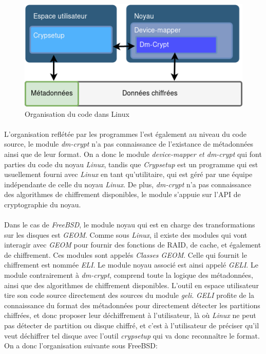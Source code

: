 \paragraph{}
\begin{figure}[h]
\centering
\includegraphics[width=.8\linewidth]{etat_art/organisation_linux.png}
\caption{\label{fig:OrgLinux}Organisation du code dans Linux}
\end{figure}

\paragraph{}
L'organisation reflétée par les programmes l'est également au niveau du code source,
le module {\em dm-crypt} n'a pas connaissance de l'existance de métadonnées ainsi 
que de leur format. On a donc le module {\em device-mapper \em et \em dm-crypt}
qui font parties du code du noyau {\em Linux}, tandis que {\em Crypsetup} est un 
programme qui est usuellement fourni avec {\em Linux} en tant qu'utilitaire, 
qui est géré par une équipe indépendante de celle du noyau {\em Linux}. De plus, 
{\em dm-crypt} n'a pas connaissance des algorithmes de chiffrement disponibles,
le module s'appuie sur l'API de cryptographie du noyau.

\paragraph{}
Dans le cas de {\em FreeBSD}, le module noyau qui est en charge des
transformations sur les disques est {\em GEOM}. Comme sous {\em Linux}, 
il existe des modules qui vont interagir avec {\em GEOM} pour fournir des 
fonctions de RAID, de cache, et également de chiffrement. 
Ces modules sont appelés {\em Classes GEOM}. 
Celle qui fournit le chiffrement est nommée {\em ELI}. Le module noyau associé 
est ainsi appelé {\em GELI}. Le module contrairement à {\em dm-crypt}, 
comprend toute la logique des métadonnées, ainsi que des algorithmes de 
chiffrement disponibles. L'outil en espace utilisateur tire son code source
directement des sources du module {\em geli}. {\em GELI} profite de la 
connaissance du format des métadonnées pour directement détecter les 
partitions chiffrées, et donc proposer leur déchiffrement à l'utilisateur, 
là où {\em Linux} ne peut pas détecter de
partition ou disque chiffré, et c'est à l'utilisateur de préciser qu'il veut 
déchiffrer tel disque avec l'outil {\em crypsetup} qui va donc reconnaître le 
format. On a donc l'organisation suivante sous FreeBSD:


